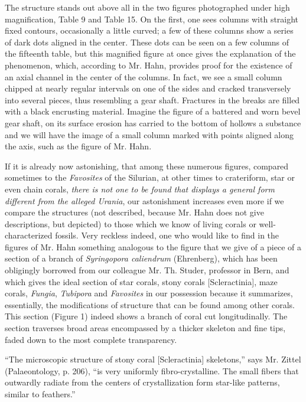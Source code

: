 \documentclass[a4paper, 12pt, oneside]{article}
\begin{document}
The structure stands out above all in the two figures photographed under high magnification, Table 9 and Table 15. On the first, one sees columns with straight fixed contours, occasionally a little curved; a few of these columns show a series of dark dots aligned in the center. These dots can be seen on a few columns of the fifteenth table, but this magnified figure at once gives the explanation of the phenomenon, which, according to Mr. Hahn, provides proof for the existence of an axial channel in the center of the columns. In fact, we see a small column chipped at nearly regular intervals on one of the sides and cracked transversely into several pieces, thus resembling a gear shaft. Fractures in the breaks are filled with a black encrusting material. Imagine the figure of a battered and worn bevel gear shaft, on its surface erosion has carried to the bottom of hollows a substance and we will have the image of a small column marked with points aligned along the axis, such as the figure of Mr. Hahn.

If it is already now astonishing, that among these numerous figures, compared sometimes to the \emph{Favosites} of the Silurian, at other times to crateriform, star or even chain corals, \emph{there is not one to be found that displays a general form different from the alleged Urania}, our astonishment increases even more if we compare the structures (not described, because Mr. Hahn does not give descriptions, but depicted) to those which we know of living corals or well-characterized fossils. Very reckless indeed, one who would like to find in the figures of Mr. Hahn something analogous to the figure that we give of a piece of a section of a branch of \emph{Syringopora caliendrum} (Ehrenberg), which has been obligingly borrowed from our colleague Mr. Th. Studer, professor in Bern, and which gives the ideal section of star corals, stony corals [Scleractinia], maze corals, \emph{Fungia}, \emph{Tubipora} and \emph{Favosites} in our possession because it summarizes, essentially, the modifications of structure that can be found among other corals. This section (Figure 1) indeed shows a branch of coral cut longitudinally. The section traverses broad areas encompassed by a thicker skeleton and fine tips, faded down to the most complete transparency.

``The microscopic structure of stony coral [Scleractinia] skeletons,'' says Mr. Zittel (Palaeontology, p. 206), ``is very uniformly fibro-crystalline. The small fibers that outwardly radiate from the centers of crystallization form star-like patterns, similar to feathers.''
\end{document}
